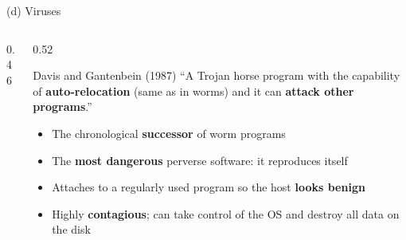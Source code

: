 \documentclass[aspectratio=169,11pt,xcolor={table}]{beamer}
\begin{document}
\begin{frame}{(d) Viruses}
  \begin{columns}[c]
    \begin{column}{0.46\textwidth}
      \centering
    \end{column}
    \begin{column}{0.52\textwidth}
      \begin{block}{Davis and Gantenbein (1987)}
        \small ``A Trojan horse program with the capability of \textbf{auto-relocation} (same as in worms) and it can \textbf{attack other programs}.''
      \end{block}
      \begin{itemize}\small\setlength{\itemsep}{2pt}
        \item The chronological \textbf{successor} of worm programs
        \item The \textbf{most dangerous} perverse software: it reproduces itself
        \item Attaches to a regularly used program so the host \textbf{looks benign}
        \item Highly \textbf{contagious}; can take control of the OS and destroy all data on the disk
      \end{itemize}
    \end{column}
  \end{columns}
\end{frame}
\end{document}
